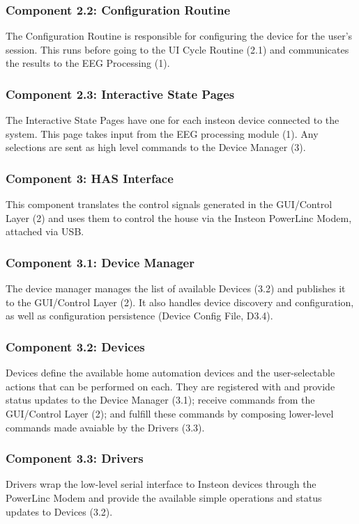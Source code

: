 \documentclass{article}
\begin{document}
\subsubsection{Component 2.2: Configuration Routine}
The Configuration Routine is responsible for configuring the device for the user's session. This runs before going to the UI Cycle Routine (2.1) and communicates the results to the EEG Processing (1). 

\subsubsection{Component 2.3: Interactive State Pages}
The Interactive State Pages have one for each insteon device connected to the system. This page takes input from the EEG processing module (1). Any selections are sent as high level commands to the Device Manager (3).

\subsubsection{Component 3: HAS Interface}
This component translates the control signals generated in the GUI/Control
Layer (2) and uses them to control the house via the Insteon PowerLinc Modem,
attached via USB.

\subsubsection{Component 3.1: Device Manager}
The device manager manages the list of available Devices (3.2) and publishes
it to the GUI/Control Layer (2). It also handles device discovery and
configuration, as well as configuration persistence (Device Config File,
D3.4).

\subsubsection{Component 3.2: Devices}
Devices define the available home automation devices and the user-selectable
actions that can be performed on each. They are registered with and provide
status updates to the Device Manager (3.1); receive commands from the
GUI/Control Layer (2); and fulfill these commands by composing lower-level
commands made avaiable by the Drivers (3.3).

\subsubsection{Component 3.3: Drivers}
Drivers wrap the low-level serial interface to Insteon devices through the
PowerLinc Modem and provide the available simple operations and status updates
to Devices (3.2).
\end{document}
